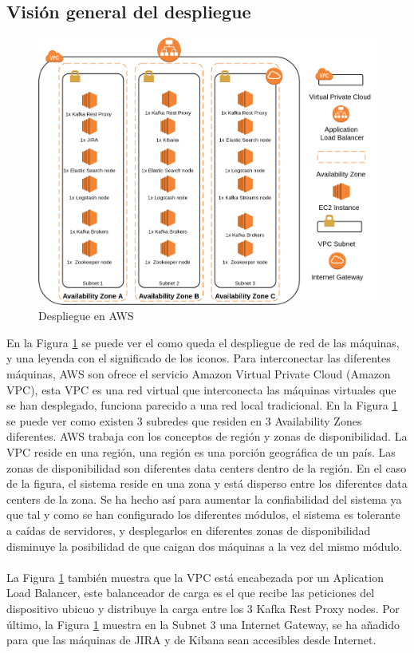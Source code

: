 \subsection{Visión general del despliegue}\label{cap:networking}

\begin{figure}[!htb]
	\includegraphics[width=\linewidth] {Moduloss-Netdeploy.png}
	\caption{Despliegue en AWS}
	\label{fig:networking1}
\end{figure}

En la Figura \ref{fig:networking1} se puede ver el como queda el despliegue de red de las máquinas, y una leyenda con el significado de los iconos. Para interconectar las diferentes máquinas, AWS son ofrece el servicio Amazon Virtual Private Cloud (Amazon VPC), esta VPC es una red virtual que interconecta las máquinas virtuales que se han desplegado, funciona parecido a una red local tradicional. En la Figura \ref{fig:networking1} se puede ver como existen 3 subredes que residen en 3 Availability Zones diferentes. AWS trabaja con los conceptos de región y zonas de disponibilidad. La VPC reside en una región, una región es una porción geográfica de un país. Las zonas de disponibilidad son diferentes data centers dentro de la región. En el caso de la figura, el sistema reside en una zona y está disperso entre los diferentes data centers de la zona. Se ha hecho así para aumentar la confiabilidad del sistema ya que tal y como se han configurado los diferentes módulos, el sistema es tolerante a caídas de servidores, y desplegarlos en diferentes zonas de disponibilidad disminuye la posibilidad de que caigan dos máquinas a la vez del mismo módulo.
\\\\
La Figura \ref{fig:networking1} también muestra que la VPC está encabezada por un Aplication Load Balancer, este balanceador de carga es el que recibe las peticiones del dispositivo ubicuo y distribuye la carga entre los 3 Kafka Rest Proxy nodes. Por último, la Figura \ref{fig:networking1} muestra en la Subnet 3 una Internet Gateway, se ha añadido para que las máquinas de JIRA y de Kibana sean accesibles desde Internet.


